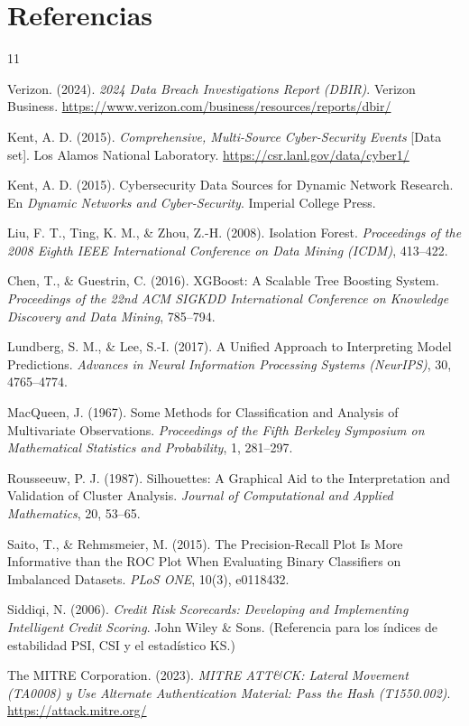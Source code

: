 \documentclass[12pt, a4paper]{article}
\begin{document}
\section{Referencias}

\renewcommand{\refname}{}
\begin{thebibliography}{11}

Verizon. (2024). \textit{2024 Data Breach Investigations Report (DBIR)}. Verizon Business.
\url{https://www.verizon.com/business/resources/reports/dbir/}

Kent, A. D. (2015). \textit{Comprehensive, Multi-Source Cyber-Security Events} [Data set]. Los Alamos
National Laboratory. \url{https://csr.lanl.gov/data/cyber1/}

Kent, A. D. (2015). Cybersecurity Data Sources for Dynamic Network Research. En \textit{Dynamic
Networks and Cyber-Security}. Imperial College Press.

Liu, F. T., Ting, K. M., \& Zhou, Z.-H. (2008). Isolation Forest. \textit{Proceedings of the 2008
Eighth IEEE International Conference on Data Mining (ICDM)}, 413--422.

Chen, T., \& Guestrin, C. (2016). XGBoost: A Scalable Tree Boosting System. \textit{Proceedings of the
22nd ACM SIGKDD International Conference on Knowledge Discovery and Data Mining}, 785--794.

Lundberg, S. M., \& Lee, S.-I. (2017). A Unified Approach to Interpreting Model Predictions.
\textit{Advances in Neural Information Processing Systems (NeurIPS)}, 30, 4765--4774.

MacQueen, J. (1967). Some Methods for Classification and Analysis of Multivariate Observations.
\textit{Proceedings of the Fifth Berkeley Symposium on Mathematical Statistics and Probability}, 1,
281--297.

Rousseeuw, P. J. (1987). Silhouettes: A Graphical Aid to the Interpretation and Validation of Cluster
Analysis. \textit{Journal of Computational and Applied Mathematics}, 20, 53--65.

Saito, T., \& Rehmsmeier, M. (2015). The Precision-Recall Plot Is More Informative than the ROC Plot
When Evaluating Binary Classifiers on Imbalanced Datasets. \textit{PLoS ONE}, 10(3), e0118432.

Siddiqi, N. (2006). \textit{Credit Risk Scorecards: Developing and Implementing Intelligent Credit
Scoring}. John Wiley \& Sons. (Referencia para los índices de estabilidad PSI, CSI y el estadístico KS.)

The MITRE Corporation. (2023). \textit{MITRE ATT\&CK: Lateral Movement (TA0008) y Use Alternate
Authentication Material: Pass the Hash (T1550.002)}. \url{https://attack.mitre.org/}

\end{thebibliography}
\end{document}
